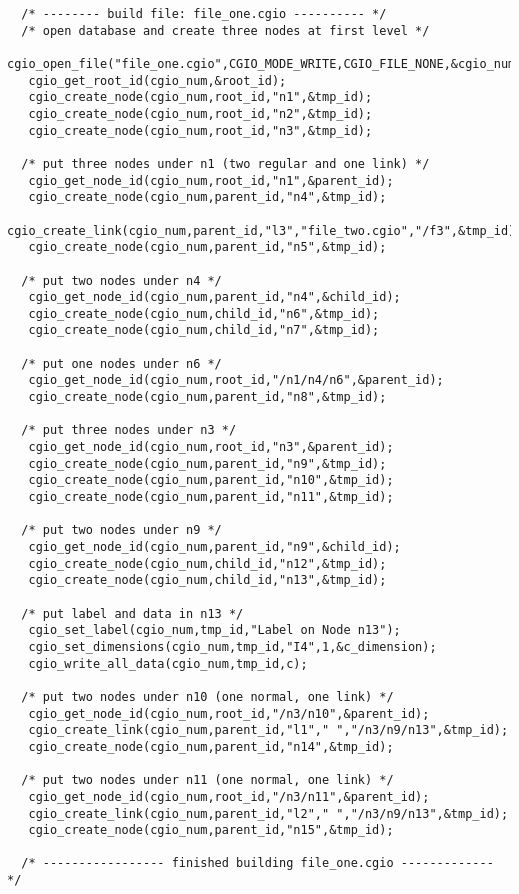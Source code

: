 \begin{verbatim}
  /* -------- build file: file_one.cgio ---------- */
  /* open database and create three nodes at first level */
   cgio_open_file("file_one.cgio",CGIO_MODE_WRITE,CGIO_FILE_NONE,&cgio_num);
   cgio_get_root_id(cgio_num,&root_id);
   cgio_create_node(cgio_num,root_id,"n1",&tmp_id);
   cgio_create_node(cgio_num,root_id,"n2",&tmp_id);
   cgio_create_node(cgio_num,root_id,"n3",&tmp_id);

  /* put three nodes under n1 (two regular and one link) */
   cgio_get_node_id(cgio_num,root_id,"n1",&parent_id);
   cgio_create_node(cgio_num,parent_id,"n4",&tmp_id);
   cgio_create_link(cgio_num,parent_id,"l3","file_two.cgio","/f3",&tmp_id);
   cgio_create_node(cgio_num,parent_id,"n5",&tmp_id);

  /* put two nodes under n4 */
   cgio_get_node_id(cgio_num,parent_id,"n4",&child_id);
   cgio_create_node(cgio_num,child_id,"n6",&tmp_id);
   cgio_create_node(cgio_num,child_id,"n7",&tmp_id);

  /* put one nodes under n6 */
   cgio_get_node_id(cgio_num,root_id,"/n1/n4/n6",&parent_id);
   cgio_create_node(cgio_num,parent_id,"n8",&tmp_id);

  /* put three nodes under n3 */
   cgio_get_node_id(cgio_num,root_id,"n3",&parent_id);
   cgio_create_node(cgio_num,parent_id,"n9",&tmp_id);
   cgio_create_node(cgio_num,parent_id,"n10",&tmp_id);
   cgio_create_node(cgio_num,parent_id,"n11",&tmp_id);

  /* put two nodes under n9 */
   cgio_get_node_id(cgio_num,parent_id,"n9",&child_id);
   cgio_create_node(cgio_num,child_id,"n12",&tmp_id);
   cgio_create_node(cgio_num,child_id,"n13",&tmp_id);

  /* put label and data in n13 */
   cgio_set_label(cgio_num,tmp_id,"Label on Node n13");
   cgio_set_dimensions(cgio_num,tmp_id,"I4",1,&c_dimension);
   cgio_write_all_data(cgio_num,tmp_id,c);

  /* put two nodes under n10 (one normal, one link) */
   cgio_get_node_id(cgio_num,root_id,"/n3/n10",&parent_id);
   cgio_create_link(cgio_num,parent_id,"l1"," ","/n3/n9/n13",&tmp_id);
   cgio_create_node(cgio_num,parent_id,"n14",&tmp_id);

  /* put two nodes under n11 (one normal, one link) */
   cgio_get_node_id(cgio_num,root_id,"/n3/n11",&parent_id);
   cgio_create_link(cgio_num,parent_id,"l2"," ","/n3/n9/n13",&tmp_id);
   cgio_create_node(cgio_num,parent_id,"n15",&tmp_id);

  /* ----------------- finished building file_one.cgio ------------- */


\end{verbatim}
